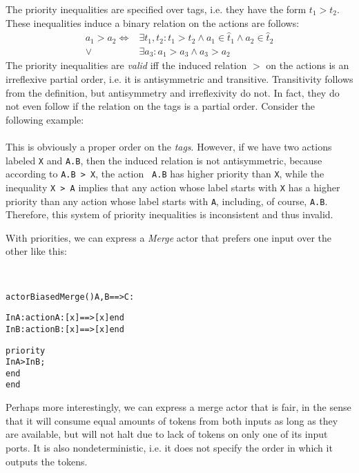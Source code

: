 The priority inequalities are specified over tags, i.e. they have the
form $t_1 > t_2$. These inequalities induce a binary relation on the
actions are follows:
\begin{align*}
  a_1 > a_2 \Longleftrightarrow & \exists t_1, t_2: t_1 > t_2 \wedge
a_1\in\hat t_1 \wedge a_2 \in \hat t_2 \\
  \vee &\exists a_3: a_1 > a_3 \wedge a_3 > a_2
\end{align*}
 The priority inequalities are {\em valid} iff the induced
relation $>$ on the actions is an irreflexive partial order, i.e. it
is antisymmetric and transitive.  Transitivity follows from the
definition, but antisymmetry and irreflexivity do not. In fact, they
do not even follow if the relation on the tags is a partial
order. Consider the following example:\\
\\
This is obviously a proper order on the {\em tags}. However, if we have two
actions labeled {\tt X} and {\tt A.B}, then the induced relation is
not antisymmetric, because according to {\tt A.B > X}, the action {\tt
  A.B} has higher priority than {\tt X}, while the inequality {\tt X >
  A} implies that any action whose label starts with {\tt X} has a
higher priority than any action whose label starts with {\tt A},
including, of course, {\tt A.B}. Therefore, this system of priority
inequalities is inconsistent and thus invalid.

With priorities, we can express a {\em Merge} actor that prefers one input
over the other like this:

\begin{example}[BiasedMerge]\ 
\begin{alltt}
actor BiasedMerge () A, B ==> C :

  InA: action A: [x] ==> [x] end
  InB: action B: [x] ==> [x] end

  priority
    InA > InB;
  end
end
\end{alltt}
\end{example}

Perhaps more interestingly, we can express a merge actor that is fair,
in the sense that it will consume equal amounts of tokens from both
inputs as long as they are available, but will not halt due to lack of
tokens on only one of its input ports. It is also nondeterministic,
i.e. it does not specify the order in which it outputs the tokens.

